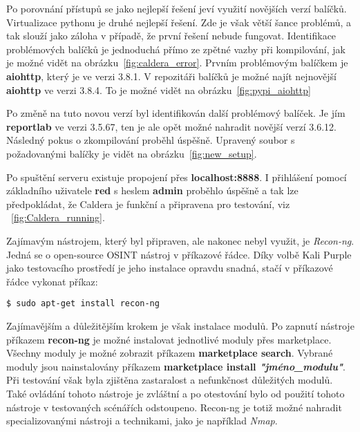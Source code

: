 Po porovnání přístupů se jako nejlepší řešení jeví využití novějších verzí balíčků.
Virtualizace pythonu je druhé nejlepší řešení.
Zde je však větší šance problémů, a tak slouží jako záloha v případě, že první řešení nebude fungovat.
Identifikace problémových balíčků je jednoduchá přímo ze zpětné vazby při kompilování, jak je možné vidět na obrázku~\ref{fig:caldera_error}.
Prvním problémovým balíčkem je \textbf{aiohttp}, který je ve verzi 3.8.1.
V repozitáři balíčků je možné najít nejnovější \textbf{aiohttp} ve verzi 3.8.4.
To je možné vidět na obrázku~\ref{fig:pypi_aiohttp}


Po změně na tuto novou verzí byl identifikován další problémový balíček.
Je jím \textbf{reportlab} ve verzi 3.5.67, ten je ale opět možné nahradit novější verzí 3.6.12.
Následný pokus o zkompilování proběhl úspěšně.
Upravený soubor s požadovanými balíčky je vidět na obrázku~\ref{fig:new_setup}.

Po spuštění serveru existuje propojení přes \textbf{localhost:8888}.
I přihlášení pomocí základního uživatele \textbf{red} s heslem \textbf{admin} proběhlo úspěšně a tak lze předpokládat, že Caldera je funkční a připravena pro testování, viz ~\ref{fig:Caldera_running}.

Zajímavým nástrojem, který byl připraven, ale nakonec nebyl využit, je \textit{Recon-ng}.
Jedná se o open-source \ac{OSINT} nástroj v příkazové řádce.
Díky volbě Kali Purple jako testovacího prostředí je jeho instalace opravdu snadná, stačí v příkazové řádce vykonat příkaz:

\begin{codeblock}
	\begin{verbatim}
$ sudo apt-get install recon-ng
	\end{verbatim}
\end{codeblock}

Zajímavějším a důležitějším krokem je však instalace modulů.
Po zapnutí nástroje příkazem \textbf{recon-ng} je možné instalovat jednotlivé moduly přes marketplace.
Všechny moduly je možné zobrazit příkazem \textbf{marketplace search}.
Vybrané moduly jsou nainstalovány příkazem \textbf{marketplace install \textit{"jméno\_modulu"}}.
Při testování však byla zjištěna zastaralost a nefunkčnost důležitých modulů.
Také ovládání tohoto nástroje je zvláštní a po otestování bylo od použití tohoto nástroje v testovaných scénářích odstoupeno.
Recon-ng je totiž možné nahradit specializovanými nástroji a technikami, jako je například \textit{Nmap}.


